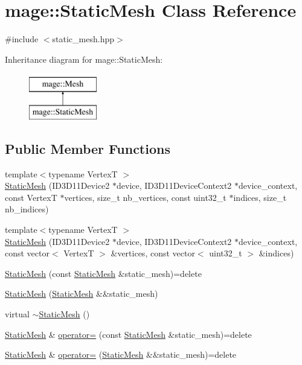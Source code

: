 \hypertarget{classmage_1_1_static_mesh}{}\section{mage\+:\+:Static\+Mesh Class Reference}
\label{classmage_1_1_static_mesh}


{\ttfamily \#include $<$static\+\_\+mesh.\+hpp$>$}

Inheritance diagram for mage\+:\+:Static\+Mesh\+:\begin{figure}[H]
\begin{center}
\leavevmode
\includegraphics[height=2.000000cm]{classmage_1_1_static_mesh}
\end{center}
\end{figure}
\subsection*{Public Member Functions}
\begin{DoxyCompactItemize}
\item 
{\footnotesize template$<$typename VertexT $>$ }\\\hyperlink{classmage_1_1_static_mesh_ab66b5c11fee10d2e7cbe8bdd4b45d6fe}{Static\+Mesh} (I\+D3\+D11\+Device2 $\ast$device, I\+D3\+D11\+Device\+Context2 $\ast$device\+\_\+context, const VertexT $\ast$vertices, size\+\_\+t nb\+\_\+vertices, const uint32\+\_\+t $\ast$indices, size\+\_\+t nb\+\_\+indices)
\item 
{\footnotesize template$<$typename VertexT $>$ }\\\hyperlink{classmage_1_1_static_mesh_ad114fc265795fca5dfd181341b7ccb2e}{Static\+Mesh} (I\+D3\+D11\+Device2 $\ast$device, I\+D3\+D11\+Device\+Context2 $\ast$device\+\_\+context, const vector$<$ VertexT $>$ \&vertices, const vector$<$ uint32\+\_\+t $>$ \&indices)
\item 
\hyperlink{classmage_1_1_static_mesh_a15be69ad312c252c9816a57ec1555d73}{Static\+Mesh} (const \hyperlink{classmage_1_1_static_mesh}{Static\+Mesh} \&static\+\_\+mesh)=delete
\item 
\hyperlink{classmage_1_1_static_mesh_a4b3fab6fc753dc32d91bd8260ba3828f}{Static\+Mesh} (\hyperlink{classmage_1_1_static_mesh}{Static\+Mesh} \&\&static\+\_\+mesh)
\item 
virtual \hyperlink{classmage_1_1_static_mesh_a7fbae949f631d29913193a1b2c2ef658}{$\sim$\+Static\+Mesh} ()
\item 
\hyperlink{classmage_1_1_static_mesh}{Static\+Mesh} \& \hyperlink{classmage_1_1_static_mesh_af73dd102f2de9cf7529e380895cfc8ff}{operator=} (const \hyperlink{classmage_1_1_static_mesh}{Static\+Mesh} \&static\+\_\+mesh)=delete
\item 
\hyperlink{classmage_1_1_static_mesh}{Static\+Mesh} \& \hyperlink{classmage_1_1_static_mesh_a38912f8555053abba649bea160d56e46}{operator=} (\hyperlink{classmage_1_1_static_mesh}{Static\+Mesh} \&\&static\+\_\+mesh)=delete
\end{DoxyCompactItemize}
